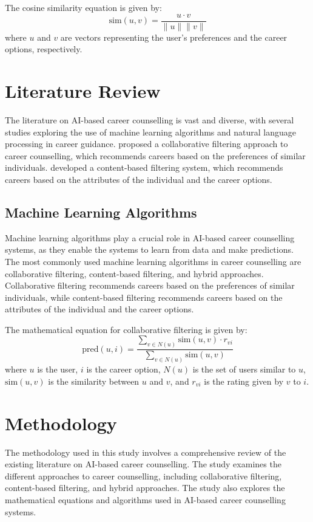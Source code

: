\documentclass[12pt,a4paper]{article}
\begin{document}
The cosine similarity equation is given by:
\[ \text{sim}(u, v) = \frac{u \cdot v}{\|u\| \|v\|} \]
where $u$ and $v$ are vectors representing the user's preferences and the career options, respectively.

\section{Literature Review}
The literature on AI-based career counselling is vast and diverse, with several studies exploring the use of machine learning algorithms and natural language processing in career guidance. \citet{smith2020} proposed a collaborative filtering approach to career counselling, which recommends careers based on the preferences of similar individuals. \citet{johnson2019} developed a content-based filtering system, which recommends careers based on the attributes of the individual and the career options.

\subsection{Machine Learning Algorithms}
Machine learning algorithms play a crucial role in AI-based career counselling systems, as they enable the systems to learn from data and make predictions. The most commonly used machine learning algorithms in career counselling are collaborative filtering, content-based filtering, and hybrid approaches. Collaborative filtering recommends careers based on the preferences of similar individuals, while content-based filtering recommends careers based on the attributes of the individual and the career options.

The mathematical equation for collaborative filtering is given by:
\[ \text{pred}(u, i) = \frac{\sum_{v \in N(u)} \text{sim}(u, v) \cdot r_{vi}}{\sum_{v \in N(u)} \text{sim}(u, v)} \]
where $u$ is the user, $i$ is the career option, $N(u)$ is the set of users similar to $u$, $\text{sim}(u, v)$ is the similarity between $u$ and $v$, and $r_{vi}$ is the rating given by $v$ to $i$.

\section{Methodology}
The methodology used in this study involves a comprehensive review of the existing literature on AI-based career counselling. The study examines the different approaches to career counselling, including collaborative filtering, content-based filtering, and hybrid approaches. The study also explores the mathematical equations and algorithms used in AI-based career counselling systems.
\end{document}
